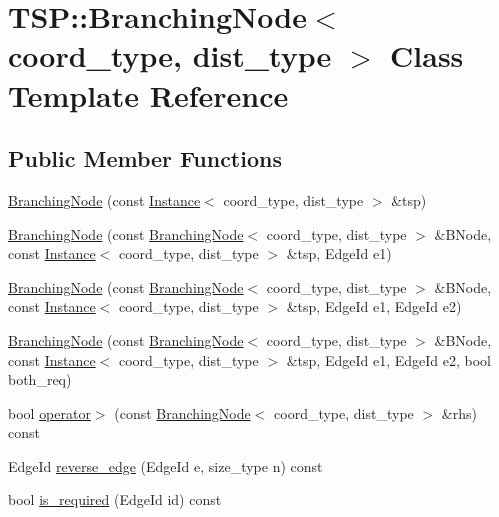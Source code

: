 \hypertarget{classTSP_1_1BranchingNode}{}\section{T\+SP\+:\+:Branching\+Node$<$ coord\+\_\+type, dist\+\_\+type $>$ Class Template Reference}
\label{classTSP_1_1BranchingNode}
\subsection*{Public Member Functions}
\begin{DoxyCompactItemize}
\item 
\hyperlink{classTSP_1_1BranchingNode_ae008ce73dea24bb2da75887253900473}{Branching\+Node} (const \hyperlink{classTSP_1_1Instance}{Instance}$<$ coord\+\_\+type, dist\+\_\+type $>$ \&tsp)
\item 
\hyperlink{classTSP_1_1BranchingNode_a7c225b395563f9d64febea67bbbe5394}{Branching\+Node} (const \hyperlink{classTSP_1_1BranchingNode}{Branching\+Node}$<$ coord\+\_\+type, dist\+\_\+type $>$ \&B\+Node, const \hyperlink{classTSP_1_1Instance}{Instance}$<$ coord\+\_\+type, dist\+\_\+type $>$ \&tsp, Edge\+Id e1)
\item 
\hyperlink{classTSP_1_1BranchingNode_a0e471c9be6f1fe647b71e8e7fd9f474e}{Branching\+Node} (const \hyperlink{classTSP_1_1BranchingNode}{Branching\+Node}$<$ coord\+\_\+type, dist\+\_\+type $>$ \&B\+Node, const \hyperlink{classTSP_1_1Instance}{Instance}$<$ coord\+\_\+type, dist\+\_\+type $>$ \&tsp, Edge\+Id e1, Edge\+Id e2)
\item 
\hyperlink{classTSP_1_1BranchingNode_a23baf0d24e0be68e98b1e54815139026}{Branching\+Node} (const \hyperlink{classTSP_1_1BranchingNode}{Branching\+Node}$<$ coord\+\_\+type, dist\+\_\+type $>$ \&B\+Node, const \hyperlink{classTSP_1_1Instance}{Instance}$<$ coord\+\_\+type, dist\+\_\+type $>$ \&tsp, Edge\+Id e1, Edge\+Id e2, bool both\+\_\+req)
\item 
bool \hyperlink{classTSP_1_1BranchingNode_a9eecc341459c700fb6c4d3f244abe90f}{operator$>$} (const \hyperlink{classTSP_1_1BranchingNode}{Branching\+Node}$<$ coord\+\_\+type, dist\+\_\+type $>$ \&rhs) const
\item 
Edge\+Id \hyperlink{classTSP_1_1BranchingNode_a5f04fd8afc44fa3965d87e0e28fa01c0}{reverse\+\_\+edge} (Edge\+Id e, size\+\_\+type n) const
\item 
bool \hyperlink{classTSP_1_1BranchingNode_aaafb7471fc91431065e446bdcd132ff8}{is\+\_\+required} (Edge\+Id id) const

\end{DoxyCompactItemize}
